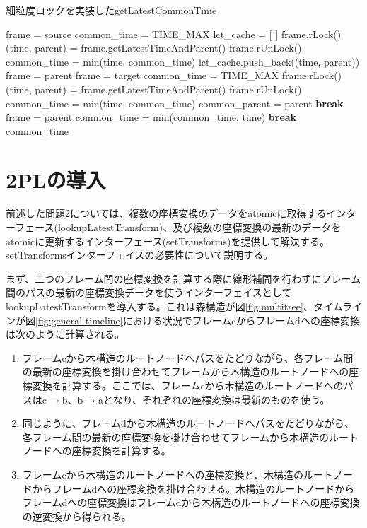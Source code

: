 \documentclass[a4paper]{jreport}	%
\begin{document}
\begin{algorithm}
\caption{細粒度ロックを実装したgetLatestCommonTime} \label{algo:getLatestCommonTime2}
\begin{algorithmic}[1]
	\State frame = source
	\State common\_time = TIME\_MAX
	\State lct\_cache = [ ] 
	\State frame.rLock()
	\State (time, parent) = frame.getLatestTimeAndParent()
	\State frame.rUnLock()
	\State common\_time = min(time, common\_time)
	\State lct\_cache.push\_back((time, parent))
	\State frame = parent
	\EndWhile
	\State frame = target
	\State common\_time = TIME\_MAX
	\State frame.rLock()
	\State (time, parent) = frame.getLatestTimeAndParent()
	\State frame.rUnLock()
	\State common\_time = min(time, common\_time)
	\State common\_parent = parent
	\State \textbf{break}
	\EndIf
	\State frame = parent
	\EndWhile
	\State common\_time = min(common\_time, time)
	\State \textbf{break}
	\EndIf
	\EndFor
	\Return common\_time
	\EndFunction
\end{algorithmic}
\end{algorithm}

\section{2PLの導入}
\label{section:intro-2pl}

前述した問題2については、複数の座標変換のデータをatomicに取得するインターフェース(lookupLatestTransform)、及び複数の座標変換の最新のデータをatomicに更新するインターフェース(setTransforms)を提供して解決する。setTransformsインターフェイスの必要性について説明する。

まず、二つのフレーム間の座標変換を計算する際に線形補間を行わずにフレーム間のパスの最新の座標変換データを使うインターフェイスとしてlookupLatestTransformを導入する。これは森構造が図\ref{fig:multitree}、タイムラインが図\ref{fig:general-timeline}における状況でフレームcからフレームdへの座標変換は次のように計算される。

\begin{enumerate}
	\item フレームcから木構造のルートノードへパスをたどりながら、各フレーム間の最新の座標変換を掛け合わせてフレームから木構造のルートノードへの座標変換を計算する。ここでは、フレームcから木構造のルートノードへのパスはc$\rightarrow$b、b$\rightarrow$aとなり、それぞれの座標変換は最新のものを使う。
	\item 同じように、フレームdから木構造のルートノードへパスをたどりながら、各フレーム間の最新の座標変換を掛け合わせてフレームから木構造のルートノードへの座標変換を計算する。
	\item フレームcから木構造のルートノードへの座標変換と、木構造のルートノードからフレームdへの座標変換を掛け合わせる。木構造のルートノードからフレームdへの座標変換はフレームdから木構造のルートノードへの座標変換の逆変換から得られる。
\end{enumerate}
\end{document}
